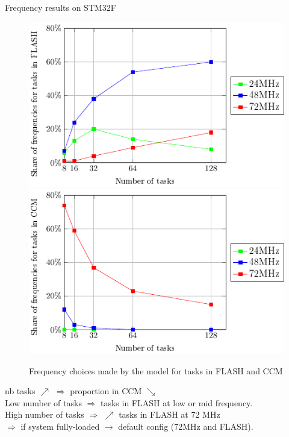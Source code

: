 \documentclass[
	11pt, %
]{beamer}
\begin{document}
\begin{frame}{Frequency results on STM32F}
	\begin{figure}
        \includegraphics[scale = 0.6]{data/model/frequency_choose.pdf}
		\includegraphics[scale = 0.6]{data/model/frequency_choose_CCM.pdf}
		\caption{Frequency choices made by the model for tasks in FLASH and CCM}
	\end{figure}
nb tasks $\nearrow$ $\Rightarrow $ proportion in CCM $\searrow$ \\
Low number of tasks $\Rightarrow $ tasks in FLASH at low or mid frequency. \\
High number of tasks $\Rightarrow $ $\nearrow$ tasks in FLASH  at 72 MHz \\
$\Rightarrow $ if system fully-loaded $\rightarrow$ default config (72MHz and FLASH).
\end{frame}
\end{document}

